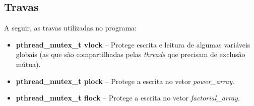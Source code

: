 \documentclass[11pt]{article}
\begin{document}
\subsection{Travas}
A seguir, as travas utilizadas no programa:
\begin{itemize}
	\item \textbf{\textcolor{sblue}{pthread\_mutex\_t} vlock} -- Protege escrita e leitura de algumas variáveis globais (as que são compartilhadas pelas \textit{threads} que precisam de exclusão mútua).
	\item \textbf{\textcolor{sblue}{pthread\_mutex\_t} plock} -- Protege a escrita no vetor \textit{power\_array}.
	\item \textbf{\textcolor{sblue}{pthread\_mutex\_t} flock} -- Protege a escrita no vetor \textit{factorial\_array}.
\end{itemize}
\end{document}
